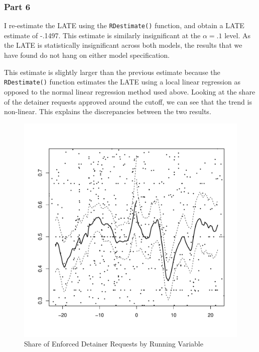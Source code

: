 \documentclass{article}\usepackage[]{graphicx}\usepackage[]{color}
\newenvironment{knitrout}{}{} %
\newenvironment{centerfig}
{\begin{figure}[H]\centering}
{\end{figure}}
\begin{document}
\subsubsection{Part 6}
I re-estimate the LATE using the \lstinline{RDestimate()} function, and obtain a LATE estimate of -.1497. This estimate is similarly insignificant at the $\alpha=.1$ level.
As the LATE is statistically insignificant across both models, the results that we have found do not hang on either model specification.

This estimate is slightly larger than the previous estimate because the \lstinline{RDestimate()} function estimates the LATE using a local linear regression as opposed to the normal linear regression method used above.
Looking at the share of the detainer requests approved around the cutoff, we can see that the trend is non-linear. This explains the discrepancies between the two results.

\begin{centerfig}
\caption{Share of Enforced Detainer Requests by Running Variable}
\begin{knitrout}
\color{fgcolor}
\includegraphics[width=1\linewidth]{figure/unnamed-chunk-7-1} 

\end{knitrout}
\end{centerfig}
\end{document}

